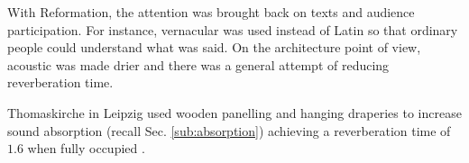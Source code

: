 \documentclass[a4paper]{article}
\begin{document}
With Reformation, the attention was brought back on texts and audience participation. For instance, vernacular was used instead of Latin so that ordinary people could understand what was said. On the architecture point of view, acoustic was made drier and there was a general attempt of reducing reverberation time.

Thomaskirche in Leipzig used wooden panelling and hanging draperies to increase sound absorption (recall Sec. \ref{sub:absorption}) achieving a reverberation time of $1.6$ when fully occupied \cite{article:acoustic:churches}.




\printbibliography

%
%


\end{document}
